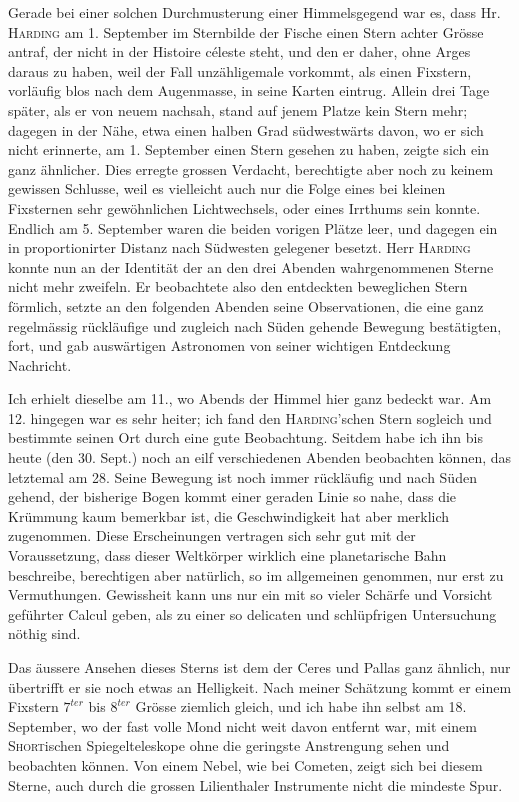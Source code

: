 Gerade bei einer solchen Durchmusterung einer Himmelsgegend war es, dass Hr. \textsc{Harding} am 1. September im Sternbilde der Fische einen Stern achter Grösse antraf, der nicht in der Histoire céleste steht, und den er daher, ohne Arges daraus zu haben, weil der Fall unzähligemale vorkommt, als einen Fixstern, vorläufig blos nach dem Augenmasse, in seine Karten eintrug. Allein drei Tage später, als er von neuem nachsah, stand auf jenem Platze kein Stern mehr; dagegen in der Nähe, etwa einen halben Grad südwestwärts davon, wo er sich nicht erinnerte, am 1. September einen Stern gesehen zu haben, zeigte sich ein ganz ähnlicher. Dies erregte grossen Verdacht, berechtigte aber noch zu keinem gewissen Schlusse, weil es vielleicht auch nur die Folge eines bei kleinen Fixsternen sehr gewöhnlichen Lichtwechsels, oder eines Irrthums sein konnte. Endlich am 5. September waren die beiden vorigen Plätze leer, und dagegen ein in proportionirter Distanz nach Südwesten gelegener besetzt. Herr \textsc{Harding} konnte nun an der Identität der an den drei Abenden wahrgenommenen Sterne nicht mehr zweifeln. Er beobachtete also den entdeckten beweglichen Stern förmlich, setzte an den folgenden Abenden seine Observationen, die eine ganz regelmässig rückläufige und zugleich nach Süden gehende Bewegung bestätigten, fort, und gab auswärtigen Astronomen von seiner wichtigen Entdeckung Nachricht.

Ich erhielt dieselbe am 11., wo Abends der Himmel hier ganz bedeckt war. Am 12. hingegen war es sehr heiter; ich fand den \textsc{Harding}'schen Stern sogleich und bestimmte seinen Ort durch eine gute Beobachtung. Seitdem habe ich ihn bis heute (den 30. Sept.) noch an eilf verschiedenen Abenden beobachten können, das letztemal am 28. Seine Bewegung ist noch immer rückläufig und nach Süden gehend, der bisherige Bogen kommt einer geraden Linie so nahe, dass die Krümmung kaum bemerkbar ist, die Geschwindigkeit hat aber merklich zugenommen. Diese Erscheinungen vertragen sich sehr gut mit der Voraussetzung, dass dieser Weltkörper wirklich eine planetarische Bahn beschreibe, berechtigen aber natürlich, so im allgemeinen genommen, nur erst zu Vermuthungen. Gewissheit kann uns nur ein
mit so vieler Schärfe und Vorsicht geführter Calcul geben, als zu einer so delicaten und
schlüpfrigen Untersuchung nöthig sind.

Das äussere Ansehen dieses Sterns ist dem der Ceres und Pallas ganz ähnlich, nur übertrifft
er sie noch etwas an Helligkeit. Nach meiner Schätzung kommt er einem Fixstern $7^{ter}$ bis
$8^{ter}$ Grösse ziemlich gleich, und ich habe ihn selbst am 18. September, wo der fast volle
Mond nicht weit davon entfernt war, mit einem \textsc{Short}ischen Spiegelteleskope ohne die
geringste Anstrengung sehen und beobachten können. Von einem Nebel, wie bei Cometen, zeigt sich
bei diesem Sterne, auch durch die grossen Lilienthaler Instrumente nicht die mindeste Spur.

